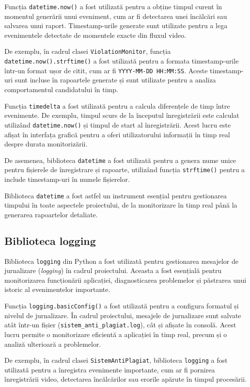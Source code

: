 \documentclass[12pt,a4paper]{article}
\begin{document}
Funcția \texttt{datetime.now()} a fost utilizată pentru a obține timpul curent în momentul generării unui eveniment, cum ar fi detectarea unei încălcări sau salvarea unui raport. Timestamp-urile generate sunt utilizate pentru a lega evenimentele detectate de momentele exacte din fluxul video.

De exemplu, în cadrul clasei \texttt{ViolationMonitor}, funcția \texttt{datetime.now().strftime()} a fost utilizată pentru a formata timestamp-urile într-un format ușor de citit, cum ar fi \texttt{YYYY-MM-DD HH:MM:SS}. Aceste timestamp-uri sunt incluse în rapoartele generate și sunt utilizate pentru a analiza comportamentul candidatului în timp.

Funcția \texttt{timedelta} a fost utilizată pentru a calcula diferențele de timp între evenimente. De exemplu, timpul scurs de la începutul înregistrării este calculat utilizând \texttt{datetime.now()} și timpul de start al înregistrării. Acest lucru este afișat în interfața grafică pentru a oferi utilizatorului informații în timp real despre durata monitorizării.

De asemenea, biblioteca \texttt{datetime} a fost utilizată pentru a genera nume unice pentru fișierele de înregistrare și rapoarte, utilizând funcția \texttt{strftime()} pentru a include timestamp-uri în numele fișierelor.

Biblioteca \texttt{datetime} a fost astfel un instrument esențial pentru gestionarea timpului în toate aspectele proiectului, de la monitorizare în timp real până la generarea rapoartelor detaliate.

\subsection{Biblioteca logging}
Biblioteca \texttt{logging}\cite{logging} din Python a fost utilizată pentru gestionarea mesajelor de jurnalizare (\textit{logging}) în cadrul proiectului. Aceasta a fost esențială pentru monitorizarea funcționării aplicației, diagnosticarea problemelor și păstrarea unui istoric al evenimentelor importante.

Funcția \texttt{logging.basicConfig()} a fost utilizată pentru a configura formatul și nivelul de jurnalizare. În cadrul proiectului, mesajele de jurnalizare sunt salvate atât într-un fișier (\texttt{sistem\_anti\_plagiat.log}), cât și afișate în consolă. Acest lucru permite o monitorizare eficientă a aplicației în timp real, precum și o analiză ulterioară a problemelor.

De exemplu, în cadrul clasei \texttt{SistemAntiPlagiat}, biblioteca \texttt{logging} a fost utilizată pentru a înregistra evenimente importante, cum ar fi pornirea înregistrării video, detectarea încălcărilor sau erorile apărute în timpul procesării.
\end{document}
